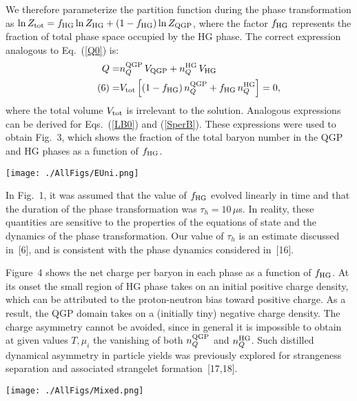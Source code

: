 \begin{mdframed}[linecolor=gray,roundcorner=12pt,backgroundcolor=Dandelion!15,linewidth=1pt,leftmargin=0cm,rightmargin=0cm,topline=true,bottomline=true,skipabove=12pt]
We therefore parameterize the partition function during the phase transformation as $\ln{Z_{\rm tot}}=f_{\rm HG} \ln{Z_{\rm HG}}+(1 - f_{\rm HG}) \ln{Z_{\rm QGP}}$, where the factor $f_{\rm HG}$ represents the fraction of total phase space occupied by the HG phase. The correct expression analogous to Eq.~(\ref{Q0}) is:
\begin{align}
Q  = & n_Q^{\rm QGP}\, V_{\rm QGP}+n_Q^{\rm HG}\, V_{\rm HG} 
\notag \\ 
\tag{6}
   = & V_{\rm tot} \left[ (1-f_{\rm HG})\, n_Q^{\rm QGP}+f_{\rm HG}\, n_Q^{\rm HG} \right]=0,
\end{align}
where the total volume $V_{\rm tot}$ is irrelevant to the solution. Analogous expressions can be derived for Eqs.~(\ref{LB0}) and (\ref{SperB}). These expressions were used to obtain Fig.~3, which shows the fraction of the total baryon number in the QGP and HG phases as a function of $f_{\rm HG}$.
 
\centerline{\texttt{[image: ./AllFigs/EUni.png]}}

In Fig.~1, it was assumed that the value of $f_{\rm HG}$ evolved linearly in time and that the duration of the phase transformation was $\tau_h=10\,\mu$s. In reality, these quantities are sensitive to the properties of the equations of state and the dynamics of the phase transformation. Our value of $\tau_h$ is an estimate discussed in~[6], and is consistent with the phase dynamics considered in~[16].

Figure~4 shows the net charge per baryon in each phase as a function of $f_{\rm HG}$. At its onset the small region of HG phase takes on an initial positive charge density, which can be attributed to the proton-neutron bias toward positive charge. As a result, the QGP domain takes on a (initially tiny) negative charge density. The charge asymmetry cannot be avoided, since in general it is impossible to obtain at given values $T,\mu_i$ the vanishing of both $n_Q^{\rm QGP}$ and $n_Q^{\rm HG}$. Such distilled dynamical asymmetry in particle yields was previously explored for strangeness separation and associated strangelet formation~[17,18].

\centerline{\texttt{[image: ./AllFigs/Mixed.png]}}


\end{mdframed}
